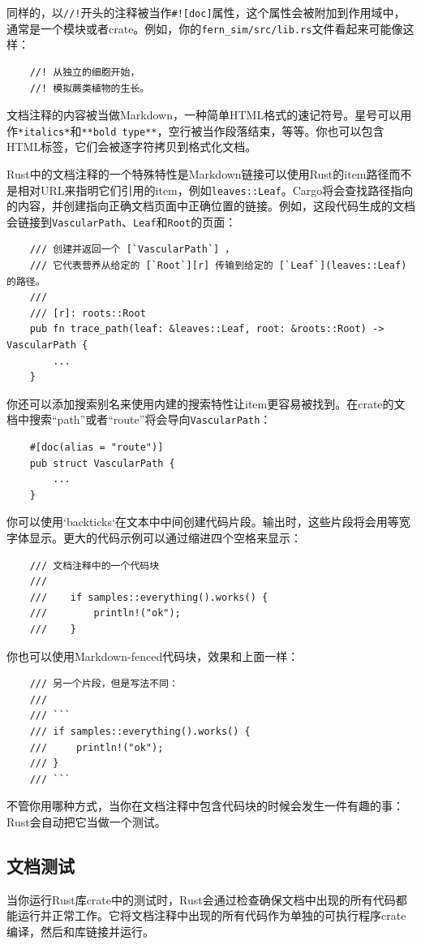 同样的，以\texttt{//!}开头的注释被当作\texttt{\#![doc]}属性，这个属性会被附加到作用域中，通常是一个模块或者crate。例如，你的\texttt{fern\_sim/src/lib.rs}文件看起来可能像这样：
\begin{verbatim}
    //! 从独立的细胞开始，
    //! 模拟蕨类植物的生长。
\end{verbatim}

文档注释的内容被当做Markdown，一种简单HTML格式的速记符号。星号可以用作\texttt{*italics*}和\texttt{**bold type**}，空行被当作段落结束，等等。你也可以包含HTML标签，它们会被逐字符拷贝到格式化文档。

Rust中的文档注释的一个特殊特性是Markdown链接可以使用Rust的item路径而不是相对URL来指明它们引用的item，例如\texttt{leaves::Leaf}。Cargo将会查找路径指向的内容，并创建指向正确文档页面中正确位置的链接。例如，这段代码生成的文档会链接到\texttt{VascularPath}、\texttt{Leaf}和\texttt{Root}的页面：
\begin{verbatim}
    /// 创建并返回一个 [`VascularPath`] ，
    /// 它代表营养从给定的 [`Root`][r] 传输到给定的 [`Leaf`](leaves::Leaf) 的路径。
    ///
    /// [r]: roots::Root
    pub fn trace_path(leaf: &leaves::Leaf, root: &roots::Root) -> VascularPath {
        ...
    }
\end{verbatim}

你还可以添加搜索别名来使用内建的搜索特性让item更容易被找到。在crate的文档中搜索“path”或者“route”将会导向\texttt{VascularPath}：
\begin{verbatim}
    #[doc(alias = "route")]
    pub struct VascularPath {
        ...
    }
\end{verbatim}

你可以使用`backticks`在文本中中间创建代码片段。输出时，这些片段将会用等宽字体显示。更大的代码示例可以通过缩进四个空格来显示：
\begin{verbatim}
    /// 文档注释中的一个代码块
    ///
    ///    if samples::everything().works() {
    ///        println!("ok");
    ///    }
\end{verbatim}
你也可以使用Markdown-fenced代码块，效果和上面一样：
\begin{verbatim}
    /// 另一个片段，但是写法不同：
    /// 
    /// ```
    /// if samples::everything().works() {
    ///     println!("ok");
    /// }
    /// ```
\end{verbatim}

不管你用哪种方式，当你在文档注释中包含代码块的时候会发生一件有趣的事：Rust会自动把它当做一个测试。

\subsection{文档测试}
当你运行Rust库crate中的测试时，Rust会通过检查确保文档中出现的所有代码都能运行并正常工作。它将文档注释中出现的所有代码作为单独的可执行程序crate编译，然后和库链接并运行。

